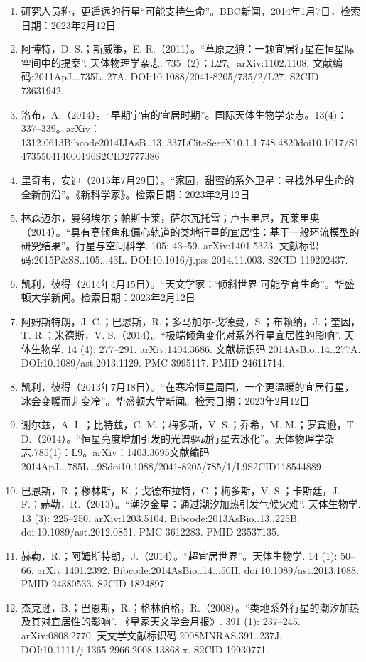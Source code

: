 \begin{enumerate}
\item 研究人员称，更遥远的行星“可能支持生命”。BBC新闻，2014年1月7日，检索日期：2023年2月12日
\item 阿博特，D. S.；斯威策，E. R.（2011）。“草原之狼：一颗宜居行星在恒星际空间中的提案”. 天体物理学杂志. 735（2）：L27。arXiv:1102.1108. 文献编码:2011ApJ...735L..27A. DOI:10.1088/2041-8205/735/2/L27. S2CID 73631942.
\item 洛布，A.（2014）。“早期宇宙的宜居时期”。国际天体生物学杂志。13(4)：337–339。arXiv：1312.0613Bibcode2014IJAsB..13..337LCiteSeerX10.1.1.748.4820doi10.1017/S1473550414000196S2CID2777386
\item 里奇韦，安迪（2015年7月29日）。“家园，甜蜜的系外卫星：寻找外星生命的全新前沿”。《新科学家》。检索日期：2023年2月12日
\item 林森迈尔，曼努埃尔；帕斯卡莱，萨尔瓦托雷；卢卡里尼，瓦莱里奥（2014）。“具有高倾角和偏心轨道的类地行星的宜居性：基于一般环流模型的研究结果”。行星与空间科学. 105: 43–59. arXiv:1401.5323. 文献标识码:2015P&SS..105...43L. DOI:10.1016/j.pss.2014.11.003. S2CID 119202437.
\item 凯利，彼得（2014年4月15日）。“天文学家：‘倾斜世界’可能孕育生命”。华盛顿大学新闻。检索日期：2023年2月12日
\item 阿姆斯特朗，J. C.；巴恩斯，R.；多马加尔-戈德曼，S.；布赖纳，J.；奎因，T. R.；米德斯，V. S.（2014）。“极端倾角变化对系外行星宜居性的影响”. 天体生物学. 14 (4): 277–291. arXiv:1404.3686. 文献标识码:2014AsBio..14..277A. DOI:10.1089/ast.2013.1129. PMC 3995117. PMID 24611714.
\item 凯利，彼得（2013年7月18日）。“在寒冷恒星周围，一个更温暖的宜居行星，冰会变暖而非变冷”。华盛顿大学新闻。检索日期：2023年2月12日
\item 谢尔兹，A. L.；比特兹，C. M.；梅多斯，V. S.；乔希，M. M.；罗宾逊，T. D.（2014）。“恒星亮度增加引发的光谱驱动行星去冰化”。天体物理学杂志.785(1)：L9。arXiv：1403.3695文献编码2014ApJ...785L...9Sdoi10.1088/2041-8205/785/1/L9S2CID118544889
\item 巴恩斯，R.；穆林斯，K.；戈德布拉特，C.；梅多斯，V. S.；卡斯廷，J. F.；赫勒，R.（2013）。“潮汐金星：通过潮汐加热引发气候灾难”. 天体生物学. 13 (3): 225–250. arXiv:1203.5104. Bibcode:2013AsBio..13..225B. doi:10.1089/ast.2012.0851. PMC 3612283. PMID 23537135.
\item 赫勒，R.；阿姆斯特朗，J.（2014）。“超宜居世界”。天体生物学. 14 (1): 50–66. arXiv:1401.2392. Bibcode:2014AsBio..14...50H. doi:10.1089/ast.2013.1088. PMID 24380533. S2CID 1824897.
\item 杰克逊，B.；巴恩斯，R.；格林伯格，R.（2008）。“类地系外行星的潮汐加热及其对宜居性的影响”. 《皇家天文学会月报》. 391 (1): 237–245. arXiv:0808.2770. 天文学文献标识码:2008MNRAS.391..237J. DOI:10.1111/j.1365-2966.2008.13868.x. S2CID 19930771.

\end{enumerate}
